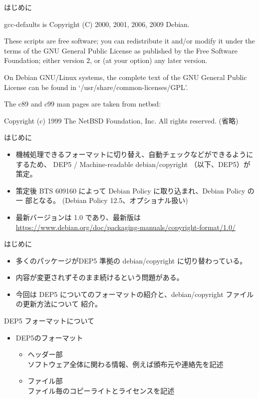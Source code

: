 \begin{frame}[containsverbatim]{はじめに}
\begin{commandlinesmall}
gcc-defaults is Copyright (C) 2000, 2001, 2006, 2009 Debian.

These scripts are free software; you can redistribute it and/or modify it
under the terms of the GNU General Public License as published by the
Free Software Foundation; either version 2, or (at your option) any
later version.

On Debian GNU/Linux systems, the complete text of the GNU General
Public License can be found in `/usr/share/common-licenses/GPL'.

The c89 and c99 man pages are taken from netbsd:

Copyright (c) 1999 The NetBSD Foundation, Inc.
All rights reserved.
(省略)
\end{commandlinesmall}
\end{frame}

\begin{frame}{はじめに}
\begin{itemize}
\item 機械処理できるフォーマットに切り替え、自動チェックなどができるようにするため、
DEP5 / Machine-readable debian/copyright （以下、DEP5）が策定。
\item 策定後 BTS 609160 によって Debian Policy に取り込まれ、Debian Policy の一
部となる。
(Debian Policy 12.5、オプショナル扱い)
\item 最新バージョンは 1.0 であり、最新版は
\url{https://www.debian.org/doc/packaging-manuals/copyright-format/1.0/}
\end{itemize}
\end{frame}

\begin{frame}{はじめに}
\begin{itemize}
\item 多くのパッケージがDEP5 準拠の debian/copyright に切り替わっている。
\item 内容が変更されずそのまま続けるという問題がある。
\item 今回は DEP5 についてのフォーマットの紹介と、debian/copyright ファイルの更新方法について
紹介。
\end{itemize}
\end{frame}


\begin{frame}{DEP5 フォーマットについて}

\begin{itemize}
\item DEP5のフォーマット
\begin{itemize}
\item ヘッダー部 \\
  ソフトウェア全体に関わる情報、例えば頒布元や連絡先を記述
\item ファイル部 \\
  ファイル毎のコピーライトとライセンスを記述
\end{itemize}
\end{itemize}
\end{frame}

